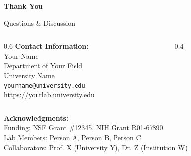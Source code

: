 \documentclass[aspectratio=169,11pt]{beamer}
\begin{document}
\begin{frame}[plain]
  \begin{center}
    {\LARGE \textbf{Thank You}}
    
    \vspace{1cm}
    
    {\Large Questions \& Discussion}
    
    \vspace{1.5cm}
    
    \begin{columns}
      \begin{column}{0.6\textwidth}
        \textbf{Contact Information:}\\
        Your Name\\
        Department of Your Field\\
        University Name\\
        \texttt{yourname@university.edu}\\
        \url{https://yourlab.university.edu}
      \end{column}
      
      \begin{column}{0.4\textwidth}
      \end{column}
    \end{columns}
    
    \vspace{1cm}
    
    {\footnotesize
      \textbf{Acknowledgments:}\\
      Funding: NSF Grant \#12345, NIH Grant R01-67890\\
      Lab Members: Person A, Person B, Person C\\
      Collaborators: Prof. X (University Y), Dr. Z (Institution W)
    }
  \end{center}
\end{frame}


\appendix
\end{document}
